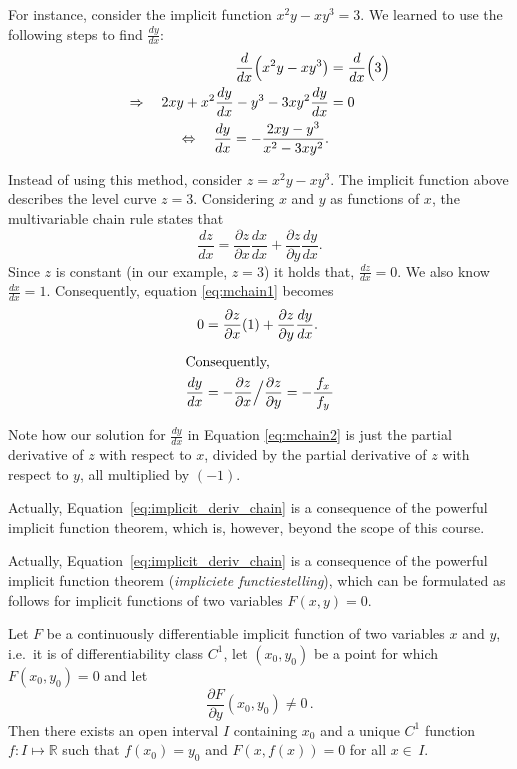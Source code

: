 For instance, consider the implicit function $x^2y-xy^3=3.$ We learned to use the following steps to find $\frac{dy}{dx}$:
\begin{align}
\frac{d}{dx}\Big(x^2y-xy^3\big) &= \frac{d}{dx}\Big(3\Big) \notag\\
\Rightarrow \quad  2xy + x^2\frac{dy}{dx}-y^3-3xy^2\frac{dy}{dx} &= 0\notag \\
\Leftrightarrow \quad \frac{dy}{dx} = -\frac{2xy-y^3}{x^2-3xy^2}.\label{eq:mchain2}
\end{align}

Instead of using this method, consider $z=x^2y-xy^3$. The implicit function above describes the level curve $z=3$. Considering $x$ and $y$ as functions of $x$, the multivariable chain rule states that
\begin{equation}\frac{dz}{dx} = \frac{\partial z}{\partial x}\frac{dx}{dx}+\frac{\partial z}{\partial y}\frac{dy}{dx}.\label{eq:mchain1}\end{equation}
Since $z$ is constant (in our example, $z=3$) it holds that, $\frac{dz}{dx} = 0$. We also know $\frac{dx}{dx} = 1$. Consequently, equation \eqref{eq:mchain1} becomes
\begin{align}
0 &= \frac{\partial z}{\partial x}(1) + \frac{\partial z}{\partial y}\frac{dy}{dx}. \quad \nonumber\\[5pt]
\intertext{Consequently,}
\frac{dy}{dx} &= -\frac{\partial z}{\partial x}\Big/\frac{\partial z}{\partial y} = -\frac{\,f_x\,}{f_y}\label{eq:implicit_deriv_chain}
\end{align}

Note how our solution for $\frac{dy}{dx}$ in Equation \eqref{eq:mchain2} is just the partial derivative of $z$ with respect to $x$, divided by the partial derivative of $z$ with respect to $y$, all multiplied by $(-1)$.

\ifcalculus
Actually, Equation~\eqref{eq:implicit_deriv_chain} is a consequence of the powerful implicit function theorem, which is, however, beyond the scope of this course. 
\fi

\ifanalysis

Actually, Equation~\eqref{eq:implicit_deriv_chain} is a consequence of the powerful implicit function theorem (\textit{impliciete functiestelling}), which can be formulated as follows for implicit functions of two variables $F(x,y)=0$. 

\pagebreak
\begin{theorem}
\label{thm:implicit1}
Let $F$ be a continuously differentiable implicit function of two variables $x$ and $y$, i.e.\ it is of differentiability  class $C^1$,  let $(x_0,y_0)$ be a point for which $F(x_0,y_0)=0$ and let 
$$
\dfrac{\partial F}{\partial y}(x_0,y_0)\neq0\,.
$$
Then there exists an open interval $I$ containing $x_0$ and a unique $C^1$ function $f:I\mapsto\mathbb{R}$ such that
$f(x_0)=y_0$ and $F(x,f(x))=0$ for all $x\in\,I$.
\end{theorem}

